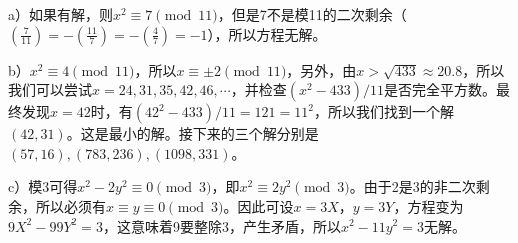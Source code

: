 %
\exercise a）如果有解，则$x^2\equiv 7\pmod{11}$，但是7不是模11的二次剩余（$\left(\frac{7}{11}\right)=-\left(\frac{11}{7}\right)=-\left(\frac{4}{7}\right)=-1$），所以方程无解。\par
b）$x^2\equiv4\pmod{11}$，所以$x\equiv\pm2\pmod{11}$，另外，由$x>\sqrt{433}\approx20.8$，所以我们可以尝试$x=24,31,35,42,46,\cdots$，并检查$(x^2-433)/11$是否完全平方数。最终发现$x=42$时，有$(42^2-433)/11=121=11^2$，所以我们找到一个解$(42,31)$。这是最小的解。接下来的三个解分别是$(57,16),(783,236),(1098,331)$。\par
c）模3可得$x^2-2y^2\equiv0\pmod3$，即$x^2\equiv2y^2\pmod3$。由于2是3的非二次剩余，所以必须有$x\equiv y\equiv 0\pmod{3}$。因此可设$x=3X$，$y=3Y$，方程变为$9X^2-99Y^2=3$，这意味着9要整除3，产生矛盾，所以$x^2-11y^2=3$无解。
